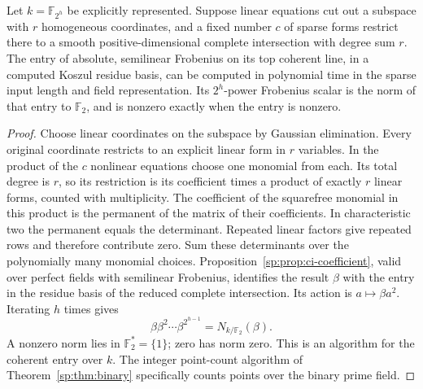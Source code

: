 \begin{proposition}
\label{sp:prop:binary-extension}
Let $k=\mathbb F_{2^h}$ be explicitly represented. Suppose linear
equations cut out a subspace with $r$ homogeneous coordinates, and a
fixed number $c$ of sparse forms restrict there to a smooth
positive-dimensional complete intersection with degree sum $r$.
The entry of absolute, semilinear Frobenius on its top coherent line,
in a computed Koszul residue basis, can be computed in polynomial time
in the sparse input length and field representation. Its $2^h$-power
Frobenius scalar is the norm of that entry to $\mathbb F_2$, and is
nonzero exactly when the entry is nonzero.
\end{proposition}
\begin{proof}
Choose linear coordinates on the subspace by Gaussian elimination.
Every original coordinate restricts to an explicit linear form in
$r$ variables. In the product of the $c$ nonlinear equations choose
one monomial from each. Its total degree is $r$, so its restriction
is its coefficient times a product of exactly $r$ linear forms,
counted with multiplicity. The coefficient of the squarefree monomial
in this product is the permanent of the matrix of their coefficients.
In characteristic two the permanent equals the determinant. Repeated
linear factors give repeated rows and therefore contribute zero.
Sum these determinants over the polynomially many monomial choices.
Proposition~\ref{sp:prop:ci-coefficient}, valid over perfect fields
with semilinear Frobenius, identifies the result $\beta$ with the
entry in the residue basis of the reduced complete intersection.
Its action is $a\mapsto\beta a^2$. Iterating $h$ times gives
\[
 \beta\beta^2\cdots\beta^{2^{h-1}}
   =N_{k/\mathbb F_2}(\beta).
\]
A nonzero norm lies in $\mathbb F_2^*=\{1\}$; zero has norm zero.
This is an algorithm for the coherent entry over $k$. The integer
point-count algorithm of Theorem~\ref{sp:thm:binary} specifically
counts points over the binary prime field.
\end{proof}

